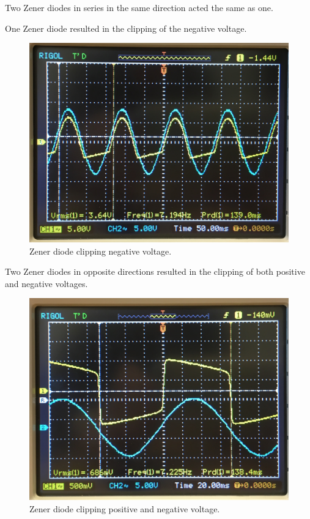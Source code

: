 \documentclass[twocolumn, amsmath]{revtex4}
\begin{document}
Two Zener diodes in series in the same direction acted the same as one.

One Zener diode resulted in the clipping of the negative voltage.
\begin{figure}[h]
    \includegraphics[scale=0.06]{zener2}  
    \caption{Zener diode clipping negative voltage.}
\end{figure}
Two Zener diodes in opposite directions resulted in the clipping of both positive and negative voltages.
\begin{figure}[h]
    \includegraphics[scale=0.06]{zener1}  
    \caption{Zener diode clipping positive and negative voltage.}
\end{figure}
\end{document}
